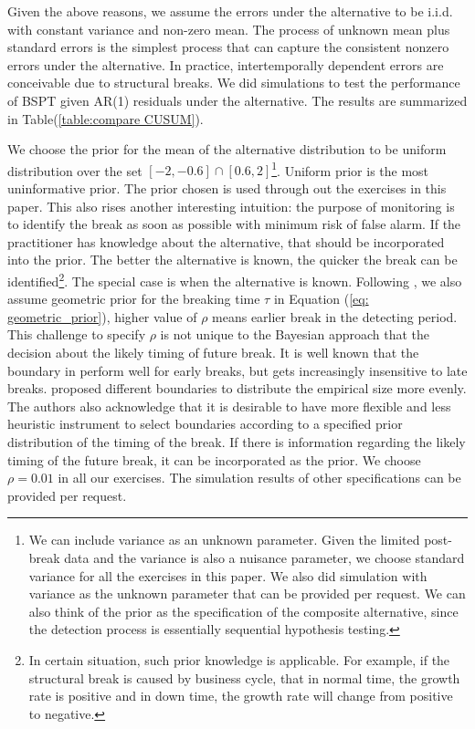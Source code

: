 \documentclass[preprint,authoryear,12pt,english]{elsarticle}
\theoremstyle{plain}
\begin{document}
Given the above reasons, we assume the errors under the alternative to be i.i.d. with constant variance and non-zero mean. The process of unknown mean plus standard errors is the simplest process that can capture the consistent nonzero errors under the alternative. In practice, intertemporally dependent errors are conceivable due to structural breaks. We did simulations to test the performance of BSPT given AR(1) residuals under the alternative. The results are summarized in Table(\ref{table:compare CUSUM}).

We choose the prior for the mean of the alternative distribution to be uniform distribution over the set $[-2,-0.6]\cap[0.6,2]$\footnote{We can include variance as an unknown parameter. Given the limited post-break data and the variance is also a nuisance parameter, we choose standard variance for all the exercises in this paper. We also did simulation with variance as the unknown parameter that can be provided per request. We can also think of the prior as the specification of the composite alternative, since the detection process is essentially sequential hypothesis testing.}. Uniform prior is the most uninformative prior. The prior chosen is used through out the exercises in this paper. This also rises another interesting intuition: the purpose of monitoring is to identify the break as soon as possible with minimum risk of false alarm. If the practitioner has knowledge about the alternative, that should be incorporated into the prior. The better the alternative is known, the quicker the break can be identified\footnote{In certain situation, such prior knowledge is applicable. For example, if the structural break is caused by business cycle, that in normal time, the growth rate is positive and in down time, the growth rate will change from positive to negative.}. The special case is when the alternative is known. Following \cite{Shiryaev1963}, we also assume geometric prior for the breaking time $\tau$ in Equation (\ref{eq: geometric_prior}), higher value of $\rho$ means earlier break in the detecting period. This challenge to specify $\rho$ is not unique to the Bayesian approach that the decision about the likely timing of future break. It is well known that the boundary in \cite{Chu1996} perform well for early breaks, but gets increasingly insensitive to late breaks. \cite{Zeileis2005} proposed different boundaries to distribute the empirical size more evenly. The authors also acknowledge that it is desirable to have more flexible and less heuristic instrument to select boundaries according to a specified prior distribution of the timing of the break. If there is information regarding the likely timing of the future break, it can be incorporated as the prior. We choose $\rho=0.01$ in all our exercises. The simulation results of other specifications can be provided per request.
\end{document}
